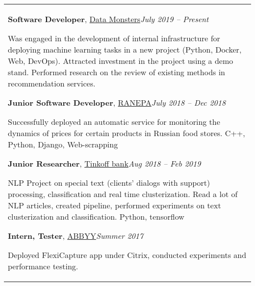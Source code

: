\documentclass[a4paper,12pt]{memoir} %
\newcommand{\opendialog}{\bluebullet}
\newcommand{\bullitem}[1]{\opendialog #1}
\begin{document}
	\begin{tabular}{p{} }
		\bullitem{\textbf{Software Developer}, \href{https://datamonsters.com/}{Data Monsters}}\hfill\emph{July 2019 -- Present}
		
		Was engaged in the development of internal infrastructure for deploying machine learning tasks in a new project (Python, Docker, Web, DevOps). Attracted investment in the project using a demo stand. Performed research on the review of existing methods in recommendation services.
		
		\SepSep
		\bullitem{\textbf{Junior Software Developer}, \href{https://www.ranepa.ru/eng/}{RANEPA}}\hfill\emph{July 2018 -- Dec 2018}
		
		Successfully deployed an automatic service for monitoring the dynamics of prices for certain products in Russian food stores. C++, Python, Django, Web-scrapping
		
		\SepSep
		\bullitem{\textbf{Junior Researcher}, \href{https://www.tinkoff.ru/eng/}{Tinkoff bank}\hfill\emph{Aug 2018 -- Feb 2019}
			
		NLP Project on special text (clients' dialogs with support) processing, classification and real time clusterization. Read a lot of NLP articles, created pipeline, performed experiments on text clusterization and classification.} Python, tensorflow

		\SepSep
		\bullitem{\textbf{Intern, Tester}, \href{https://www.abbyy.com/en-eu/}{ABBYY}}\hfill\emph{Summer 2017} 
		
		Deployed FlexiCapture app under Citrix, conducted experiments and performance testing.
	\end{tabular}
	
	\vspace{0.9em}
	
\end{document}
